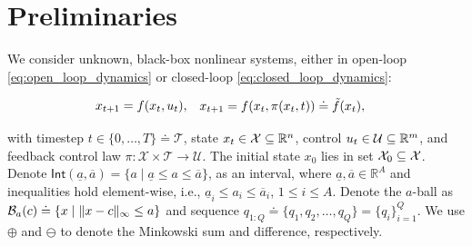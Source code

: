 \section{Preliminaries}
\label{preliminary}
We consider unknown, black-box nonlinear systems, either in open-loop \eqref{eq:open_loop_dynamics} or closed-loop \eqref{eq:closed_loop_dynamics}:

\vspace{-20pt}
\begin{subequations}%
\begin{align}
    x_{t+1} &= f(x_t, u_t),
    \label{eq:open_loop_dynamics}
\end{align}

\vspace{-30pt}
\begin{align}
    x_{t+1} &= f(x_t, \pi(x_t, t)) \doteq \tilde f(x_t),
    \label{eq:closed_loop_dynamics}
\end{align}
\end{subequations}
\vspace{-20pt}

\noindent with timestep $t \in \{0, \dots, T\} \doteq \mathcal{T}$, state $x_t \in \mathcal{X} \subseteq \mathbb{R}^n$, control $u_t \in \mathcal{U} \subseteq \mathbb{R}^m$, and feedback control law $\pi: \mathcal{X} \times \mathcal{T} \rightarrow \mathcal{U}$. The initial state $x_0$ lies in set $\mathcal{X}_0 \subseteq \mathcal{X}$. Denote $\textsf{Int}(\underline{a}, \overline{a}) = \{a \mid \underline{a} \le a \le \overline{a}\}$, as an interval, where $\underline{a}, \overline{a} \in \mathbb{R}^A$ and inequalities hold element-wise, i.e., $\underline{a}_i \le a_i \le \overline{a}_i$, $1 \le i \le A$. Denote the $a$-ball as $\mathcal{B}_a(c) \doteq \{ x \mid \Vert x - c \Vert_\infty \le a\}$ and sequence $q_{1:Q} \doteq \{q_1, q_2, \ldots, q_Q\} = \{q_i\}_{i=1}^Q$. We use $\oplus$ and $\ominus$ to denote the Minkowski sum and difference, respectively. %

